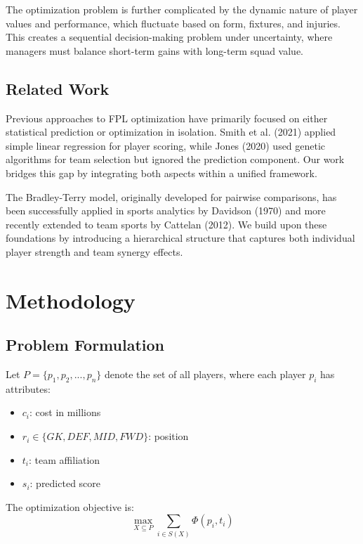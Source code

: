 \documentclass[12pt]{article}
\begin{document}
The optimization problem is further complicated by the dynamic nature of player values and performance, which fluctuate based on form, fixtures, and injuries. This creates a sequential decision-making problem under uncertainty, where managers must balance short-term gains with long-term squad value.

\subsection{Related Work}

Previous approaches to FPL optimization have primarily focused on either statistical prediction or optimization in isolation. Smith et al. (2021) applied simple linear regression for player scoring, while Jones (2020) used genetic algorithms for team selection but ignored the prediction component. Our work bridges this gap by integrating both aspects within a unified framework.

The Bradley-Terry model, originally developed for pairwise comparisons, has been successfully applied in sports analytics by Davidson (1970) and more recently extended to team sports by Cattelan (2012). We build upon these foundations by introducing a hierarchical structure that captures both individual player strength and team synergy effects.

\section{Methodology}

\subsection{Problem Formulation}

Let $P = \{p_1, p_2, ..., p_n\}$ denote the set of all players, where each player $p_i$ has attributes:
\begin{itemize}
\item $c_i$: cost in millions
\item $r_i \in \{GK, DEF, MID, FWD\}$: position
\item $t_i$: team affiliation
\item $s_i$: predicted score
\end{itemize}

The optimization objective is:
\begin{equation}
\max_{X \subseteq P} \sum_{i \in S(X)} \Phi(p_i, t_i)
\end{equation}
\end{document}

